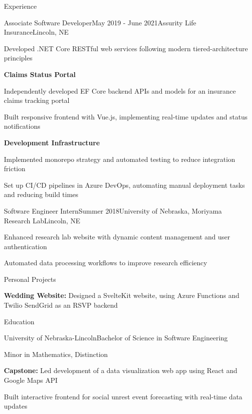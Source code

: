 \documentclass[
	10pt, %
]{article} %
\begin{document}
\begin{rSection}{Experience}
	\sectionSep

	\begin{rSubsection}{Associate Software Developer}{May 2019 - June 2021}{Assurity Life Insurance}{Lincoln, NE}
		\item[] Developed .NET Core RESTful web services following modern tiered-architecture principles
		\item[--] \textbf{Claims Status Portal}
		\item Independently developed EF Core backend APIs and models for an insurance claims tracking portal
		\item Built responsive frontend with Vue.js, implementing real-time updates and status notifications
		\item[--] \textbf{Development Infrastructure}
		\item Implemented monorepo strategy and automated testing to reduce integration friction
		\item Set up CI/CD pipelines in Azure DevOps, automating manual deployment tasks and reducing build times
	\end{rSubsection}

	\sectionSep

	\begin{rSubsection}{Software Engineer Intern}{Summer 2018}{University of Nebraska, Moriyama Research Lab}{Lincoln, NE}
		\item Enhanced research lab website with dynamic content management and user authentication
		\item Automated data processing workflows to improve research efficiency
	\end{rSubsection}

\end{rSection}

\begin{rSection}{Personal Projects}

	\begin{rSubsection}{}{}{}{}
		\item[--] \textbf{Wedding Website:} Designed a SvelteKit website, using Azure Functions and Twilio SendGrid as an RSVP backend
	\end{rSubsection}

\end{rSection}

\begin{rSection}{Education}
	\begin{rSubsection}{University of Nebraska-Lincoln}{}{Bachelor of Science in Software Engineering}{}
		\item[] Minor in Mathematics, Distinction
		\item[--] \textbf{Capstone:} Led development of a data visualization web app using React and Google Maps API
		\item Built interactive frontend for social unrest event forecasting with real-time data updates
	\end{rSubsection}
\end{rSection}
\end{document}
